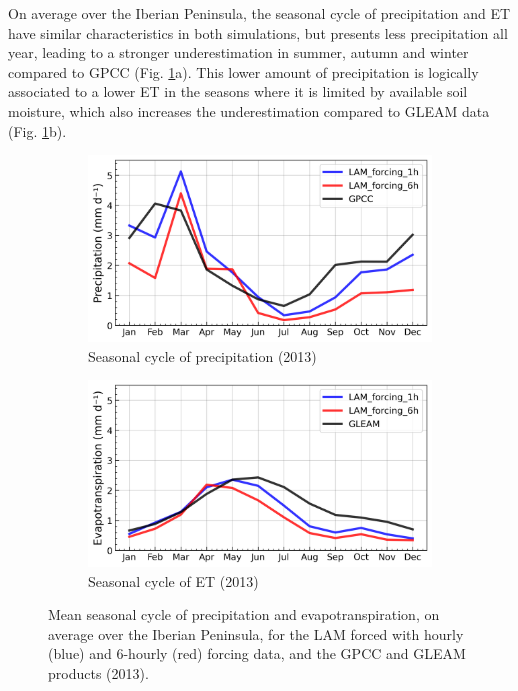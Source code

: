 On average over the Iberian Peninsula, the seasonal cycle of precipitation and ET have similar characteristics in both simulations, but \forcingsixh presents less precipitation all year, leading to a stronger underestimation in summer, autumn and winter compared to GPCC (Fig. \ref{fig:forcing_sampling_freq_SC}a). This lower amount of precipitation is logically associated to a lower ET in the seasons where it is limited by available soil moisture, which also increases the underestimation compared to GLEAM data (Fig. \ref{fig:forcing_sampling_freq_SC}b). 

\begin{figure}[htbp]
    \centering
    \begin{subfigure}[b]{0.49\textwidth}
        \caption{Seasonal cycle of precipitation (2013)}
        \includegraphics[width=\textwidth]{images/chap4/forcing_sampling_freq/IP_seasonal_cycle_precip.png}
    \end{subfigure}
    \begin{subfigure}[b]{0.49\textwidth}
        \caption{Seasonal cycle of ET (2013)}
        \includegraphics[width=\textwidth]{images/chap4/forcing_sampling_freq/IP_seasonal_cycle_evap.png}
    \end{subfigure}
    \caption{Mean seasonal cycle of precipitation and evapotranspiration, on average over the Iberian Peninsula, for the LAM forced with hourly (blue) and 6-hourly (red) forcing data, and the GPCC and GLEAM products (2013).}
    \label{fig:forcing_sampling_freq_SC}
\end{figure}

